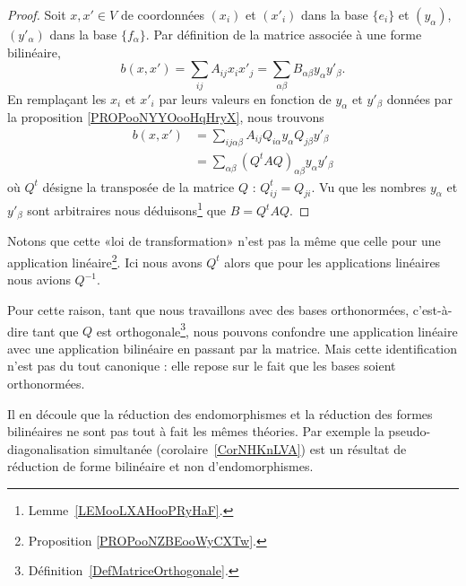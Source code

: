 \begin{proof}
	Soit \( x,x'\in V\) de coordonnées \( (x_i)\) et \( (x'_i)\) dans la base \( \{ e_i \}\) et \( (y_{\alpha})\), \( (y'_{\alpha})\) dans la base \( \{ f_{\alpha} \}\). Par définition de la matrice associée à une forme bilinéaire,
	\begin{equation}
		b(x,x')=\sum_{ij}A_{ij}x_ix'_j=\sum_{\alpha\beta}B_{\alpha\beta}y_{\alpha}y'_{\beta}.
	\end{equation}
	En remplaçant les \( x_i\) et \( x'_i\) par leurs valeurs en fonction de \( y_{\alpha}\) et \( y'_{\beta}\) données par la proposition \ref{PROPooNYYOooHqHryX}, nous trouvons
	\begin{subequations}
		\begin{align}
			b(x,x') & =\sum_{ij\alpha\beta}A_{ij}Q_{i\alpha}y_{\alpha}Q_{j\beta}y'_{\beta} \\
			        & =\sum_{\alpha\beta}(Q^tAQ)_{\alpha\beta}y_{\alpha}y'_{\beta}
		\end{align}
	\end{subequations}
	où \( Q^t\) désigne la transposée de la matrice \( Q\) :  \( Q^t_{ij}=Q_{ji}\). Vu que les nombres \( y_{\alpha}\) et \( y'_{\beta}\) sont arbitraires nous déduisons\footnote{Lemme~\ref{LEMooLXAHooPRyHaF}.} que \( B=Q^tAQ\).
\end{proof}

\begin{remark}      \label{REMooNEJLooSqgeih}
	Notons que cette «loi de transformation» n'est pas la même que celle pour une application linéaire\footnote{Proposition \ref{PROPooNZBEooWyCXTw}.}. Ici nous avons \( Q^t\) alors que pour les applications linéaires nous avions \( Q^{-1}\).

	Pour cette raison, tant que nous travaillons avec des bases orthonormées, c'est-à-dire tant que \( Q\) est orthogonale\footnote{Définition~\ref{DefMatriceOrthogonale}.}, nous pouvons confondre une application linéaire avec une application bilinéaire en passant par la matrice. Mais cette identification n'est pas du tout canonique : elle repose sur le fait que les bases soient orthonormées.

	Il en découle que la réduction des endomorphismes et la réduction des formes bilinéaires ne sont pas tout à fait les mêmes théories. Par exemple la pseudo-diagonalisation simultanée (corolaire~\ref{CorNHKnLVA}) est un résultat de réduction de forme bilinéaire et non d'endomorphismes.
\end{remark}

